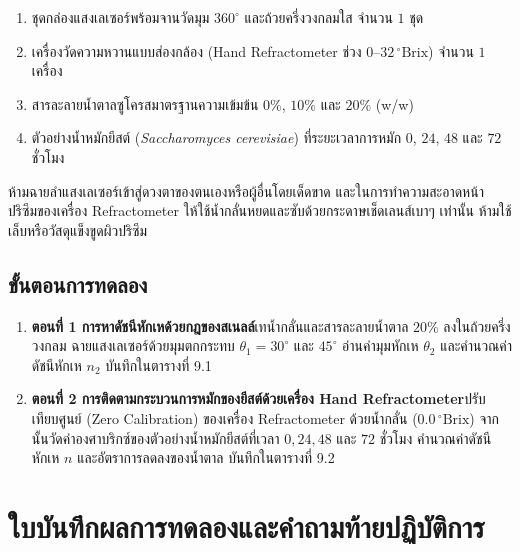 \begin{equipbox}
\begin{enumerate}
    \item ชุดกล่องแสงเลเซอร์พร้อมจานวัดมุม $360^\circ$ และถ้วยครึ่งวงกลมใส จำนวน $1$ ชุด
    \item เครื่องวัดความหวานแบบส่องกล้อง (Hand Refractometer ช่วง $0\text{--}32\,^\circ\text{Brix}$) จำนวน $1$ เครื่อง
    \item สารละลายน้ำตาลซูโครสมาตรฐานความเข้มข้น $0\%$, $10\%$ และ $20\%$ (w/w)
    \item ตัวอย่างน้ำหมักยีสต์ (\textit{Saccharomyces cerevisiae}) ที่ระยะเวลาการหมัก $0$, $24$, $48$ และ $72$ ชั่วโมง
\end{enumerate}
\end{equipbox}

\begin{warningbox}
ห้ามฉายลำแสงเลเซอร์เข้าสู่ดวงตาของตนเองหรือผู้อื่นโดยเด็ดขาด และในการทำความสะอาดหน้าปริซึมของเครื่อง Refractometer ให้ใช้น้ำกลั่นหยดและซับด้วยกระดาษเช็ดเลนส์เบาๆ เท่านั้น ห้ามใช้เล็บหรือวัสดุแข็งขูดผิวปริซึม
\end{warningbox}

\subsection{ขั้นตอนการทดลอง}
\begin{enumerate}
    \item \textbf{ตอนที่ 1 การหาดัชนีหักเหด้วยกฎของสเนลล์}\quad เทน้ำกลั่นและสารละลายน้ำตาล $20\%$ ลงในถ้วยครึ่งวงกลม ฉายแสงเลเซอร์ด้วยมุมตกกระทบ $\theta_1 = 30^\circ$ และ $45^\circ$ อ่านค่ามุมหักเห $\theta_2$ และคำนวณค่าดัชนีหักเห $n_2$ บันทึกใน\mbox{ตารางที่} 9.1
    \item \textbf{ตอนที่ 2 การติดตามกระบวนการหมักของยีสต์ด้วยเครื่อง Hand Refractometer}\quad ปรับเทียบศูนย์ (Zero Calibration) ของเครื่อง Refractometer ด้วยน้ำกลั่น ($0.0\,^\circ\text{Brix}$) จากนั้นวัดค่าองศาบริกซ์ของตัวอย่างน้ำหมักยีสต์ที่เวลา $0, 24, 48$ และ $72$ ชั่วโมง คำนวณค่าดัชนีหักเห $n$ และอัตราการลดลงของน้ำตาล บันทึกใน\mbox{ตารางที่} 9.2
\end{enumerate}

\section{ใบบันทึกผลการทดลองและคำถามท้ายปฏิบัติการ}

